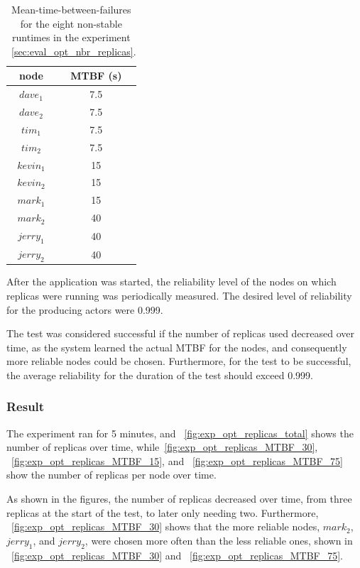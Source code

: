 \documentclass{cslthse-msc}
\begin{document}
\begin{table}[h]
	\begin{center}
	\begin{tabular}{| c  | c |}
	 \hline
	 node & MTBF (s)  \\
	 \hline		
	  $dave_1$ & 7.5 \\
	  $dave_2$ & 7.5 \\
	  $tim_1$ & 7.5 \\
	  $tim_2$ & 7.5 \\
	  $kevin_1$ & 15 \\
	  $kevin_2$ & 15 \\
	  $mark_1$ & 15 \\
	  $mark_2$ & 40 \\
	  $jerry_1$ & 40 \\
	  $jerry_2$ & 40 \\
	   \hline
	\end{tabular}
	 \caption{Mean-time-between-failures for the eight non-stable runtimes in the experiment ~\ref{sec:eval_opt_nbr_replicas}.}
	 \label{table:exp_nodes_means}
	 \end{center}
 \end{table}


After the application was started, the reliability level of the nodes on which replicas were running was periodically measured. The desired level of reliability for the producing actors were 0.999.

The test was considered successful if the number of replicas used decreased over time, as the system learned the actual MTBF for the nodes, and consequently more reliable nodes could be chosen. Furthermore, for the test to be successful, the average reliability for the duration of the test should exceed 0.999.

\subsubsection*{Result}
The experiment ran for 5 minutes, and ~\cref{fig:exp_opt_replicas_total} shows the number of replicas over time, while~\cref{fig:exp_opt_replicas_MTBF_30}, ~\cref{fig:exp_opt_replicas_MTBF_15}, and ~\cref{fig:exp_opt_replicas_MTBF_75} show the number of replicas per node over time.

As shown in the figures, the number of replicas decreased over time, from three replicas at the start of the test, to later only needing two. Furthermore, ~\cref{fig:exp_opt_replicas_MTBF_30} shows that the more reliable nodes, $mark_2$, $jerry_1$, and $jerry_2$, were chosen more often than the less reliable ones, shown in ~\cref{fig:exp_opt_replicas_MTBF_30} and ~\cref{fig:exp_opt_replicas_MTBF_75}.
\end{document}

